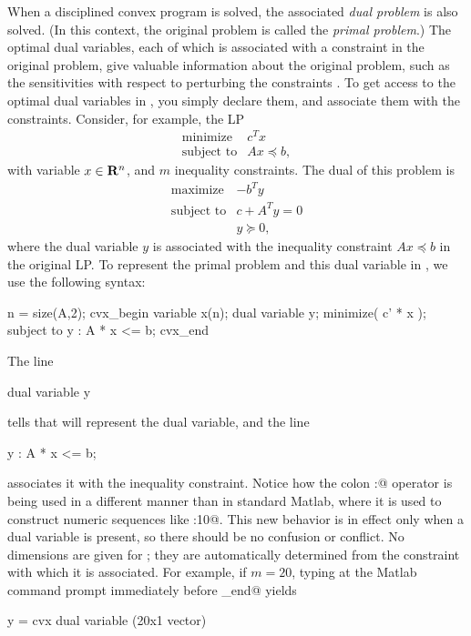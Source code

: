\documentclass[12pt]{article}
\begin{document}
When a disciplined convex program is solved, the associated 
\emph{dual problem} is also solved.
(In this context, the original problem is called the \emph{primal
problem}.)
The optimal dual variables, each of which is associated with a 
constraint in the original problem,
give valuable information about the original problem,
such as the sensitivities with respect to perturbing the constraints
\cite[Ch.5]{BV:04}.
To get access to the optimal dual variables in \cvx, you 
simply declare them, and associate them with the constraints.
Consider, for example, the LP
\[
\begin{array}{llcll}
\mbox{minimize} & c^Tx \\
\mbox{subject to} & Ax \preceq b,
\end{array}
\]
with variable $x\in\mathbf{R}^{n}$, and $m$ inequality constraints.
The dual of this problem is
\[
\begin{array}{llcll}
\mbox{maximize} & - b^T y \\
\mbox{subject to} & c + A^T y = 0 \\ & y \succeq 0,
\end{array}
\]
where the dual variable $y$ is associated with the inequality
constraint $Ax\preceq b$ in the original LP.
To represent the primal problem and 
this dual variable in \cvx, we use the following syntax:
\begin{code}
	n = size(A,2);
	cvx_begin
	    variable x(n);
	    dual variable y;
	    minimize( c' * x );
	    subject to
	        y : A * x <= b;
	cvx_end
\end{code}	
The line 
\begin{code}
	dual variable y
\end{code}
tells \cvx that \verb@y@ will represent the dual variable, and the line
\begin{code}
	y : A * x <= b;
\end{code}
associates it with the inequality constraint. Notice how the
colon \verb@:@ operator is being used in a different manner than 
in standard Matlab, where it is used to construct numeric sequences
like :10@.  This new behavior is in effect only
when a dual variable is present, so there should be no confusion 
or conflict. 
No dimensions are given
for \verb@y@; they are automatically determined from the constraint
with which it is associated. 
For example, if $m=20$, typing \verb@y@ at
the Matlab command prompt immediately before \verb@cvx_end@ yields
\begin{code}
y =
    cvx dual variable (20x1 vector)
\end{code}
\end{document}
